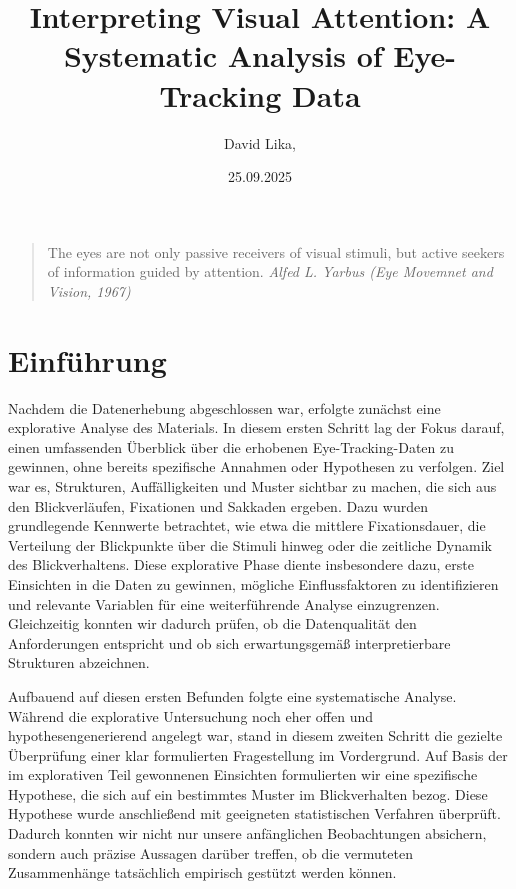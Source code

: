 \documentclass[
    language=german, %
    thesis=seminar, %
    supervisor=postdoc, %
    multiauthor=true, %
    ]{settings/csssa-thesis}
\title{Interpreting Visual Attention: A Systematic Analysis of Eye-Tracking Data}
\author{David Lika, }
\date{25.09.2025}
\begin{document}
\maketitlepage
\maketitle

\begin{quote}
    The eyes are not only passive receivers of visual stimuli, but active seekers of information guided by attention.
    {\textit{Alfed L. Yarbus (Eye Movemnet and Vision, 1967)}}
\end{quote}

\begin{abstract}
    \lipsum[1]
\end{abstract}

\section{Einführung}

Nachdem die Datenerhebung abgeschlossen war, erfolgte zunächst eine explorative Analyse des Materials.
In diesem ersten Schritt lag der Fokus darauf, einen umfassenden Überblick über die erhobenen Eye-Tracking-Daten zu gewinnen,
ohne bereits spezifische Annahmen oder Hypothesen zu verfolgen. 
Ziel war es, Strukturen, Auffälligkeiten und Muster sichtbar zu machen, die sich aus den Blickverläufen,
Fixationen und Sakkaden ergeben. Dazu wurden grundlegende Kennwerte betrachtet, wie etwa die mittlere Fixationsdauer,
die Verteilung der Blickpunkte über die Stimuli hinweg oder die zeitliche Dynamik des Blickverhaltens.
Diese explorative Phase diente insbesondere dazu, erste Einsichten in die Daten zu gewinnen,
mögliche Einflussfaktoren zu identifizieren und relevante Variablen für eine weiterführende Analyse einzugrenzen.
Gleichzeitig konnten wir dadurch prüfen, ob die Datenqualität den Anforderungen entspricht und ob sich erwartungsgemäß
interpretierbare Strukturen abzeichnen. 

Aufbauend auf diesen ersten Befunden folgte eine systematische Analyse.
Während die explorative Untersuchung noch eher offen und hypothesengenerierend angelegt war,
stand in diesem zweiten Schritt die gezielte Überprüfung einer klar formulierten Fragestellung im Vordergrund.
Auf Basis der im explorativen Teil gewonnenen Einsichten formulierten wir eine spezifische Hypothese,
die sich auf ein bestimmtes Muster im Blickverhalten bezog. Diese Hypothese wurde anschließend mit geeigneten
statistischen Verfahren überprüft. Dadurch konnten wir nicht nur unsere anfänglichen Beobachtungen absichern,
sondern auch präzise Aussagen darüber treffen, ob die vermuteten Zusammenhänge tatsächlich empirisch gestützt werden können. 
\end{document}
